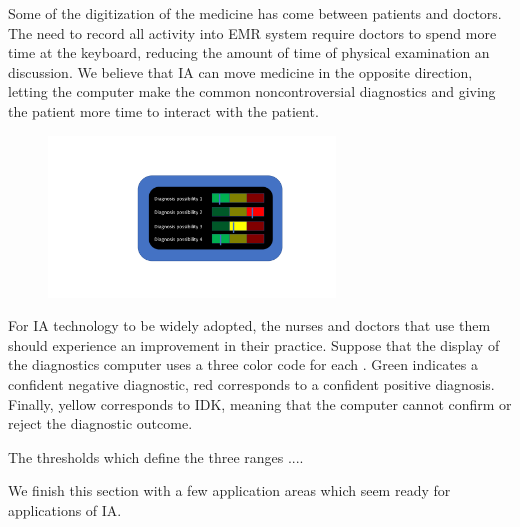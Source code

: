 \documentclass[11pt]{pnas-new}
\begin{document}
  Some of the digitization of the medicine has come between patients
  and doctors. The need to record all activity into EMR system require
  doctors to spend more time at the keyboard, reducing the amount of
  time of physical examination an discussion. We believe that IA can
  move medicine in the opposite direction, letting the computer make
  the common noncontroversial diagnostics and giving the patient more
  time to interact with the patient.

\begin{figure}[h]
\begin{center}
\includegraphics[width=3in]{figures/RedYellowGreen.pdf}
\end{center}
\end{figure}

  For IA technology to be widely adopted, the nurses and doctors that
  use them should experience an improvement in their practice. Suppose
  that the display of the diagnostics computer uses a three color code
  for each . Green indicates a confident
  negative diagnostic, red corresponds to a confident positive
  diagnosis. Finally, yellow corresponds to IDK, meaning that the
  computer cannot confirm or reject the diagnostic outcome.

  The thresholds which define the three ranges .... 


  
  We finish this section with a few application areas which seem ready
  for applications of IA.
  
\end{document}
